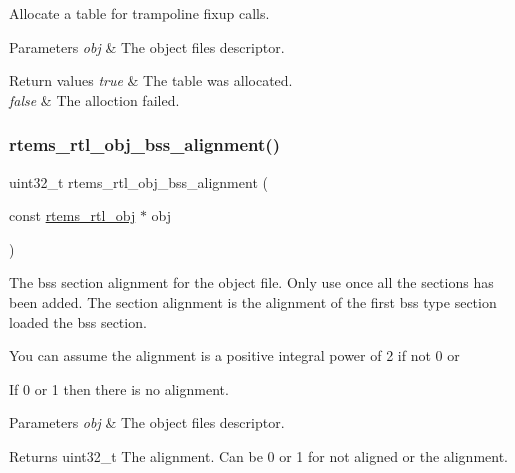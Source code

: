 Allocate a table for trampoline fixup calls.


\begin{DoxyParams}{Parameters}
{\em obj} & The object file\textquotesingle{}s descriptor. \\
\hline
\end{DoxyParams}

\begin{DoxyRetVals}{Return values}
{\em true} & The table was allocated. \\
\hline
{\em false} & The alloction failed. \\
\hline
\end{DoxyRetVals}
\mbox{\label{rtl-obj_8h_a02b040b6c3f07084733c2cb226e98fb8}} 
\subsubsection{\texorpdfstring{rtems\_rtl\_obj\_bss\_alignment()}{rtems\_rtl\_obj\_bss\_alignment()}}
{\footnotesize\ttfamily uint32\+\_\+t rtems\+\_\+rtl\+\_\+obj\+\_\+bss\+\_\+alignment (\begin{DoxyParamCaption}\item[{const \mbox{\hyperlink{structrtems__rtl__obj}{rtems\+\_\+rtl\+\_\+obj}} $\ast$}]{obj }\end{DoxyParamCaption})}

The bss section alignment for the object file. Only use once all the sections has been added. The section alignment is the alignment of the first bss type section loaded the bss section.

You can assume the alignment is a positive integral power of 2 if not 0 or
\begin{DoxyEnumerate}
\item If 0 or 1 then there is no alignment.
\end{DoxyEnumerate}


\begin{DoxyParams}{Parameters}
{\em obj} & The object file\textquotesingle{}s descriptor. \\
\hline
\end{DoxyParams}
\begin{DoxyReturn}{Returns}
uint32\+\_\+t The alignment. Can be 0 or 1 for not aligned or the alignment. 
\end{DoxyReturn}
\mbox{\label{rtl-obj_8h_a6125a7787e7b842bc39aa69370b7db2b}} 
